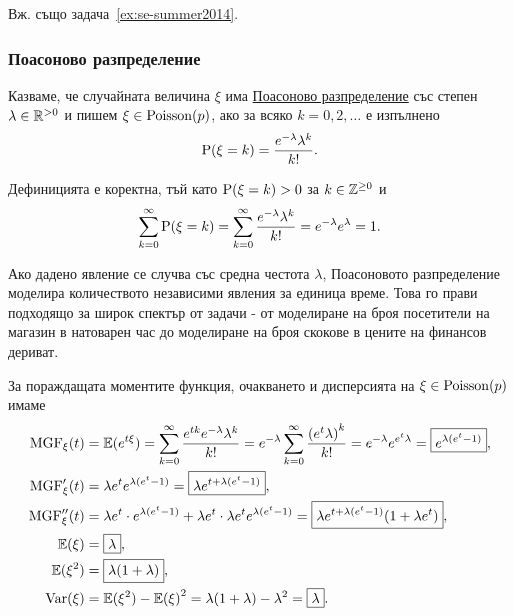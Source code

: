 \documentclass[numbers=endperiod, DIV=15, bibliography=totocnumbered]{scrartcl}
\begin{document}
Вж. също задача~\ref{ex:se-summer2014}.

\subsubsection{Поасоново разпределение}\label{dist:poisson}

\begin{definition}
  Казваме, че случайната величина $\xi$ има \uline{Поасоново разпределение} със степен $\lambda \in \mathbb{R}^{> 0}$ и пишем $\xi \in \operatorname{Poisson}(p)$, ако за всяко $k = 0, 2, \ldots$ е изпълнено
  \begin{displaymath}
    \operatorname{P}(\xi = k) = \frac{e^{-\lambda} \lambda^k} {k!}.
  \end{displaymath}

  Дефиницията е коректна, тъй като $\operatorname{P}(\xi = k) > 0$ за $k \in \mathbb{Z}^{\geq 0}$ и
  \begin{displaymath}
    \sum_{k=0}^\infty \operatorname{P}(\xi = k)
    =
    \sum_{k=0}^\infty \frac{e^{-\lambda} \lambda^k} {k!}
    =
    e^{-\lambda} e^{\lambda}
    =
    1.
  \end{displaymath}
\end{definition}

Ако дадено явление се случва със средна честота $\lambda$, Поасоновото разпределение моделира количеството независими явления за единица време. Това го прави подходящо за широк спектър от задачи - от моделиране на броя посетители на магазин в натоварен час до моделиране на броя скокове в цените на финансов дериват.

За пораждащата моментите функция, очакването и дисперсията на $\xi \in \operatorname{Poisson}(p)$ имаме
\begingroup
\allowdisplaybreaks
\begin{align*}
  \operatorname{MGF}_\xi(t)
  &=
  \mathbb{E}(e^{t\xi})
  =
  \sum_{k=0}^\infty \frac{e^{tk} e^{-\lambda} \lambda^k} {k!}
  =
  e^{-\lambda} \sum_{k=0}^\infty \frac{{(e^t \lambda)}^k} {k!}
  =
  e^{-\lambda} e^{e^t \lambda}
  =
  \boxed{e^{\lambda (e^t - 1)}},
  \\
  \operatorname{MGF}'_\xi(t)
  &=
  \lambda e^t e^{\lambda (e^t - 1)}
  =
  \boxed{\lambda e^{t + \lambda (e^t - 1)}},
  \\
  \operatorname{MGF}''_\xi(t)
  &=
  \lambda e^t \cdot e^{\lambda (e^t - 1)} + \lambda e^t \cdot \lambda e^t e^{\lambda (e^t - 1)}
  =
  \boxed{\lambda e^{t + \lambda (e^t - 1)} (1 + \lambda e^t)},
  \\
  \mathbb{E}(\xi)
  &=
  \boxed{\lambda},
  \\
  \mathbb{E}(\xi^2)
  &=
  \boxed{\lambda(1 + \lambda)},
  \\
  \operatorname{Var}(\xi)
  &=
  \mathbb{E}(\xi^2) - {\mathbb{E}(\xi)}^2
  =
  \lambda(1 + \lambda) - \lambda^2
  =
  \boxed{\lambda}.
\end{align*}
\endgroup
\end{document}
